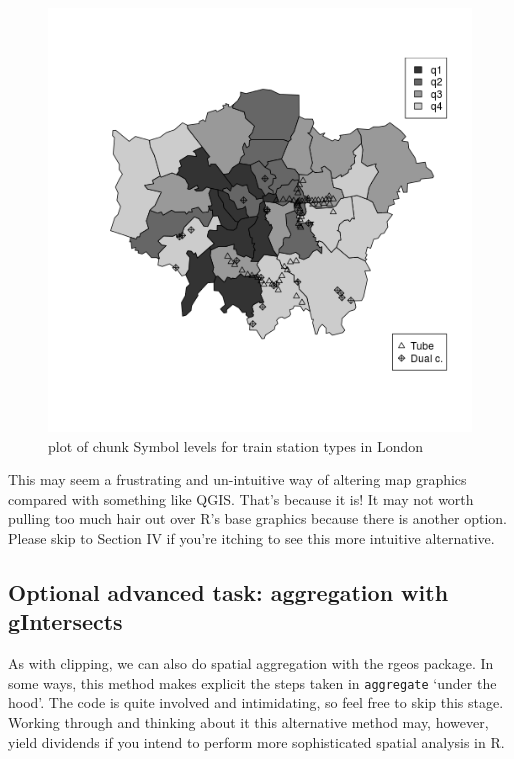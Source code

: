 \documentclass[]{article}
\begin{document}
\begin{figure}[htbp]
\centering
\includegraphics{figure/Symbol_levels_for_train_station_types_in_London.png}
\caption{plot of chunk Symbol levels for train station types in London}
\end{figure}

This may seem a frustrating and un-intuitive way of altering map
graphics compared with something like QGIS. That's because it is! It may
not worth pulling too much hair out over R's base graphics because there
is another option. Please skip to Section IV if you're itching to see
this more intuitive alternative.

\subsection{Optional advanced task: aggregation with
gIntersects}\label{optional-advanced-task-aggregation-with-gintersects}

As with clipping, we can also do spatial aggregation with the rgeos
package. In some ways, this method makes explicit the steps taken in
\texttt{aggregate} `under the hood'. The code is quite involved and
intimidating, so feel free to skip this stage. Working through and
thinking about it this alternative method may, however, yield dividends
if you intend to perform more sophisticated spatial analysis in R.
\end{document}

